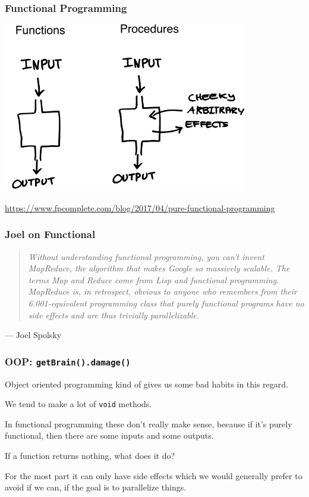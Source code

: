 \begin{frame}
\frametitle{Functional Programming}

\begin{center}
	\includegraphics[width=0.8\textwidth]{images/functional.png}
\end{center}
{\small \url{https://www.fpcomplete.com/blog/2017/04/pure-functional-programming}}


\end{frame}



\begin{frame}
\frametitle{Joel on Functional}

\begin{quote}
\textit{Without understanding functional programming, you can't invent MapReduce, the algorithm that makes Google so massively scalable. The terms Map and Reduce come from Lisp and functional programming. MapReduce is, in retrospect, obvious to anyone who remembers from their 6.001-equivalent programming class that purely functional programs have no side effects and are thus trivially parallelizable.}
\end{quote}
\hfill --- Joel Spolsky


\end{frame}

\begin{frame}
\frametitle{OOP: \texttt{getBrain().damage()}}

Object oriented programming kind of gives us some bad habits in this regard. 

We tend to make a lot of \texttt{void} methods. 

In functional programming these don't really make sense, because if it's purely functional, then there are some inputs and some outputs. 

If a function returns nothing, what does it do? 

For the most part it can only have side effects which we would generally prefer to avoid if we can, if the goal is to parallelize things. 

\end{frame}

